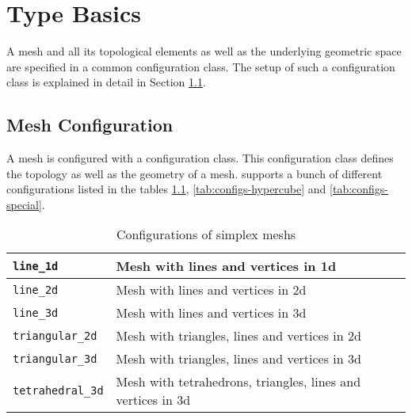\chapter{Type Basics} \label{chap:typebasics}

A mesh and all its topological elements as well as the underlying geometric space are specified in a common configuration class.
The setup of such a configuration class is explained in detail in Section \ref{sec:mesh-configuration}.

\section{Mesh Configuration} \label{sec:mesh-configuration}

A mesh is configured with a configuration class. This configuration class defines the topology as well as the geometry of a mesh. {\ViennaGrid} supports a bunch of different configurations listed in the tables \ref{tab:configs-simplex}, \ref{tab:configs-hypercube} and \ref{tab:configs-special}.


\begin{table}[tb]
  \begin{center}
    \begin{tabular}{|l|l|}
      \hline
      \lstinline|line_1d|   &  Mesh with lines and vertices in 1d  \\
      \hline
      \lstinline|line_2d|   &  Mesh with lines and vertices in 2d  \\
      \hline
      \lstinline|line_3d|   &  Mesh with lines and vertices in 3d  \\
      \hline
      \lstinline|triangular_2d| &   Mesh with triangles, lines and vertices in 2d  \\
      \hline
      \lstinline|triangular_3d| &   Mesh with triangles, lines and vertices in 3d  \\
      \hline
      \lstinline|tetrahedral_3d| &   Mesh with tetrahedrons, triangles, lines and vertices in 3d  \\
      \hline
    \end{tabular}
    \caption{Configurations of simplex meshs}
    \label{tab:configs-simplex}
  \end{center}
\end{table}


